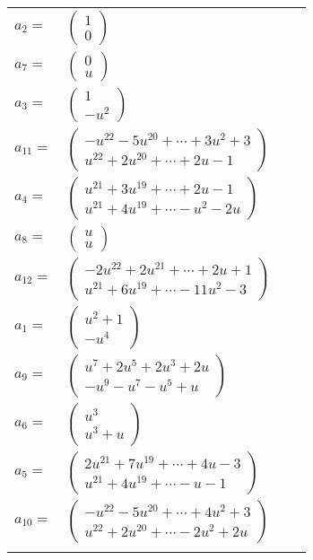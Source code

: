 \documentclass[1p]{elsarticle_modified}
\theoremstyle{definition}
\begin{document}
\begin{tabular}{m{7pt} m{180pt} m{7pt} m{180pt} }
\flushright $a_{2}=$&$\begin{pmatrix}1\\0\end{pmatrix}$ \\
\flushright $a_{7}=$&$\begin{pmatrix}0\\u\end{pmatrix}$ \\
\flushright $a_{3}=$&$\begin{pmatrix}1\\- u^2\end{pmatrix}$ \\
\flushright $a_{11}=$&$\begin{pmatrix}- u^{22}-5 u^{20}+\cdots+3 u^2+3\\u^{22}+2 u^{20}+\cdots+2 u-1\end{pmatrix}$ \\
\flushright $a_{4}=$&$\begin{pmatrix}u^{21}+3 u^{19}+\cdots+2 u-1\\u^{21}+4 u^{19}+\cdots- u^2-2 u\end{pmatrix}$ \\
\flushright $a_{8}=$&$\begin{pmatrix}u\\u\end{pmatrix}$ \\
\flushright $a_{12}=$&$\begin{pmatrix}-2 u^{22}+2 u^{21}+\cdots+2 u+1\\u^{21}+6 u^{19}+\cdots-11 u^2-3\end{pmatrix}$ \\
\flushright $a_{1}=$&$\begin{pmatrix}u^2+1\\- u^4\end{pmatrix}$ \\
\flushright $a_{9}=$&$\begin{pmatrix}u^7+2 u^5+2 u^3+2 u\\- u^9- u^7- u^5+u\end{pmatrix}$ \\
\flushright $a_{6}=$&$\begin{pmatrix}u^3\\u^3+u\end{pmatrix}$ \\
\flushright $a_{5}=$&$\begin{pmatrix}2 u^{21}+7 u^{19}+\cdots+4 u-3\\u^{21}+4 u^{19}+\cdots- u-1\end{pmatrix}$ \\
\flushright $a_{10}=$&$\begin{pmatrix}- u^{22}-5 u^{20}+\cdots+4 u^2+3\\u^{22}+2 u^{20}+\cdots-2 u^2+2 u\end{pmatrix}$\\&\end{tabular}
\end{document}
